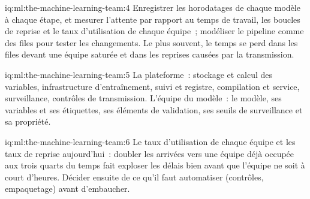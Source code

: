 \begin{solution}{iq:ml:the-machine-learning-team:4}
Enregistrer les horodatages de chaque modèle à chaque étape, et mesurer l'attente par rapport au temps de travail, les boucles de reprise et le taux d'utilisation de chaque
équipe~; modéliser le pipeline comme des files pour tester les changements. Le plus souvent, le temps se perd dans les files devant une équipe saturée et dans les reprises causées par
la transmission.
\end{solution}

\begin{solution}{iq:ml:the-machine-learning-team:5}
La plateforme~: stockage et calcul des variables, infrastructure d'entraînement, suivi et registre, compilation et service,
surveillance, contrôles de transmission. L'équipe du modèle~: le modèle, ses variables et ses étiquettes, ses éléments de validation, ses
seuils de surveillance et sa propriété.
\end{solution}

\begin{solution}{iq:ml:the-machine-learning-team:6}
Le taux d'utilisation de chaque équipe et les taux de reprise aujourd'hui~: doubler les arrivées vers une équipe déjà occupée aux trois quarts du temps
fait exploser les délais bien avant que l'équipe ne soit à court d'heures. Décider ensuite de ce qu'il faut automatiser (contrôles, empaquetage) avant d'embaucher.
\end{solution}
